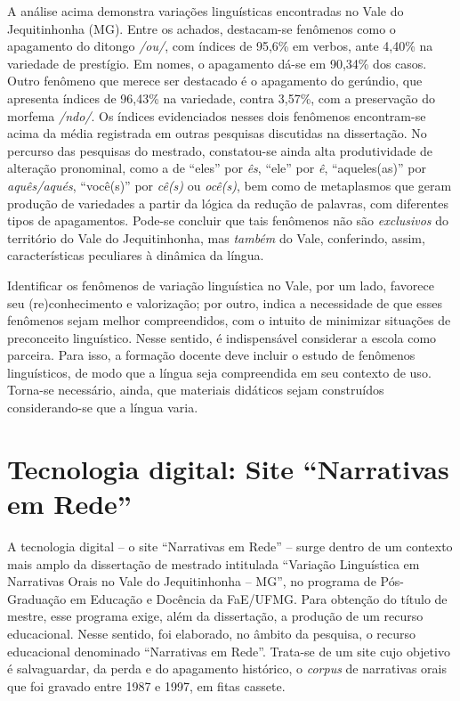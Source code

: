 \documentclass[portuguese]{textolivre}
\begin{document}
A análise acima demonstra variações linguísticas encontradas no Vale do Jequitinhonha (MG). Entre os achados, destacam-se fenômenos como o apagamento do ditongo \textit{/ou/}, com índices de 95,6\% em verbos, ante 4,40\% na variedade de prestígio. Em nomes, o apagamento dá-se em 90,34\% dos casos. Outro fenômeno que merece ser destacado é o apagamento do gerúndio, que apresenta índices de 96,43\% na variedade, contra 3,57\%, com a preservação do morfema \textit{/ndo/}. Os índices evidenciados nesses dois fenômenos encontram-se acima da média registrada em outras pesquisas discutidas na dissertação. No percurso das pesquisas do mestrado, constatou-se ainda alta produtividade de alteração pronominal, como a de “eles” por \textit{ês}, “ele” por \textit{ê}, “aqueles(as)” por \textit{aquês/aqués}, “você(s)” por \textit{cê(s)} ou \textit{ocê(s)}, bem como de metaplasmos que geram produção de variedades a partir da lógica da redução de palavras, com diferentes tipos de apagamentos. Pode-se concluir que tais fenômenos não são \textit{exclusivos} do território do Vale do Jequitinhonha, mas \textit{também} do Vale, conferindo, assim, características peculiares à dinâmica da língua.
    
Identificar os fenômenos de variação linguística no Vale, por um lado, favorece seu (re)conhecimento e valorização; por outro, indica a necessidade de que esses fenômenos sejam melhor compreendidos, com o intuito de minimizar situações de preconceito linguístico. Nesse sentido, é indispensável considerar a escola como parceira. Para isso, a formação docente deve incluir o estudo de fenômenos linguísticos, de modo que a língua seja compreendida em seu contexto de uso. Torna-se necessário, ainda, que materiais didáticos sejam construídos considerando-se que a língua varia.

\section{Tecnologia digital: Site “Narrativas em Rede”}

A tecnologia digital – o site “Narrativas em Rede” – surge dentro de um contexto mais amplo da dissertação de mestrado intitulada “Variação Linguística em Narrativas Orais no Vale do Jequitinhonha – MG”, no programa de Pós-Graduação em Educação e Docência da FaE/UFMG. Para obtenção do título de mestre, esse programa exige, além da dissertação, a produção de um recurso educacional. Nesse sentido, foi elaborado, no âmbito da pesquisa, o recurso educacional denominado “Narrativas em Rede”. Trata-se de um site cujo objetivo é salvaguardar, da perda e do apagamento histórico, o \textit{corpus} de narrativas orais que foi gravado entre 1987 e 1997, em fitas cassete.
\end{document}
